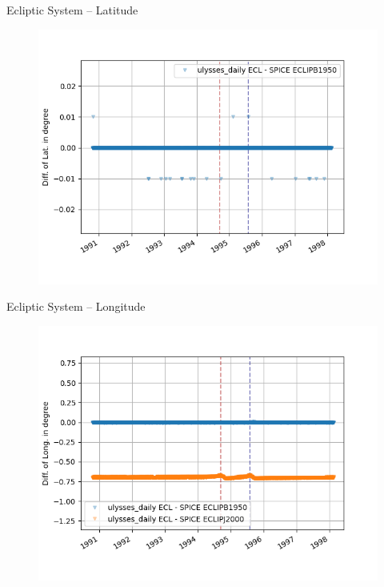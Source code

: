 \documentclass{beamer}
\begin{document}
\begin{frame}{Ecliptic System -- Latitude}
\begin{figure}									
	\includegraphics[width=1.0\textwidth]{Pics/ECL_LAT_diff.png}
\end{figure}
\end{frame}

\begin{frame}{Ecliptic System -- Longitude}
\begin{figure}									
	\includegraphics[width=1.0\textwidth]{Pics/ECL_LONG_diff.png}
\end{figure}
\end{frame}
\end{document}
